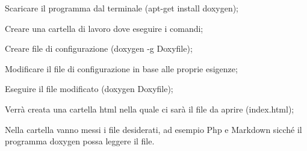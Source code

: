 \begin{DoxyItemize}
\item Scaricare il programma dal terminale (apt-\/get install doxygen);
\item Creare una cartella di lavoro dove eseguire i comandi;
\item Creare file di configurazione (doxygen -\/g Doxyfile);
\item Modificare il file di configurazione in base alle proprie esigenze;
\item Eseguire il file modificato (doxygen Doxyfile);
\item Verrà creata una cartella html nella quale ci sarà il file da aprire (index.\+html);
\item Nella cartella vanno messi i file desiderati, ad esempio Php e Markdown sicché il programma doxygen possa leggere il file. 
\end{DoxyItemize}